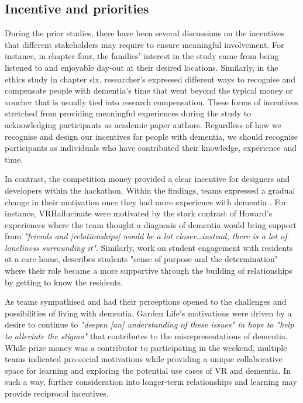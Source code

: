 \subsection{Incentive and priorities }
\label{incentive}
During the prior studies, there have been several discussions on the incentives that different stakeholders may require to ensure meaningful involvement. For instance, in chapter four, the families' interest in the study came from being listened to and enjoyable day-out at their desired locations. Similarly, in the ethics study in chapter six, researcher's expressed different ways to recognise and compensate people with dementia's time that went beyond the typical money or voucher that is usually tied into research compensation. These forms of incentives stretched from providing meaningful experiences during the study to acknowledging participants as academic paper authors. Regardless of how we recognise and design our incentives for people with dementia, we should recognise participants as individuals who have contributed their knowledge, experience and time.  

In contrast, the competition money provided a clear incentive for designers and developers within the hackathon. Within the findings, teams expressed a gradual change in their motivation once they had more experience with dementia \citep{gama2017crowdsourced}. For instance, VRHallucinate were motivated by the stark contrast of Howard's experiences where the team thought a diagnosis of dementia would bring support from \textit{"friends and [relationships] would be a lot closer…instead, there is a lot of loneliness surrounding it"}. Similarly, \citep{foley_student_2020} work on student engagement with residents at a care home, describes students "sense of purpose and the determination" where their role became a more supportive through the building of relationships by getting to know the residents.  

As teams sympathised and had their perceptions opened to the challenges and possibilities of living with dementia, Garden Life's motivations were driven by a desire to continue to \textit{"deepen [an] understanding of these issues" in hope to "help to alleviate the stigma"} that contributes to the misrepresentations of dementia. While prize money was a contributor to participating in the weekend, multiple teams indicated pro-social motivations while providing a unique collaborative space for learning and exploring the potential use cases of VR and dementia. In such a way, further consideration into longer-term relationships and learning may provide reciprocal incentives. 


